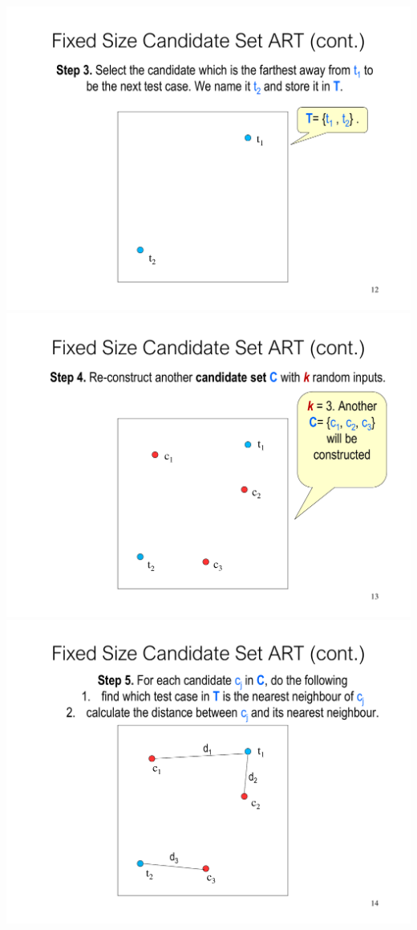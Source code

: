 \documentclass[a4paper]{article}
\begin{document}
\begin{multicols}{3}
        \includegraphics[width=\linewidth]{261.pdf}\\
        \includegraphics[width=\linewidth]{262.pdf}\\
        \includegraphics[width=\linewidth]{263.pdf}\\

\end{multicols}
\end{document}
